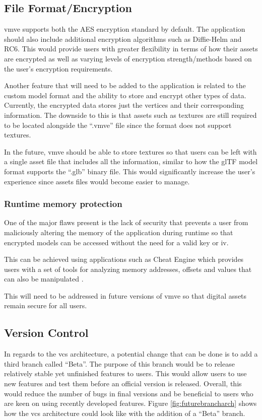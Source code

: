 \documentclass[11pt]{article}
\begin{document}
\subsection{File Format/Encryption}
\gls*{vmve} supports both the AES encryption standard by default. The application
should also include additional encryption algorithms such as Diffie-Helm and
RC6. This would provide users with greater flexibility in terms of how their
assets are encrypted as well as varying levels of encryption strength/methods
based on the user's encryption requirements.

Another feature that will need to be added to the application is related to the
custom model format and the ability to store and encrypt other types of data.
Currently, the encrypted data stores just the vertices and their corresponding
information. The downside to this is that assets such as textures are still
required to be located alongside the ``.vmve'' file since the format does not
support textures.

In the future, \gls*{vmve} should be able to store textures so that users can be
left with a single asset file that includes all the information, similar to how
the glTF model format supports the ``.glb'' binary file. This would
significantly increase the user's experience since assets files would become
easier to manage.

\subsubsection{Runtime memory protection}
One of the major flaws present is the lack of security that prevents a user from
maliciously altering the memory of the application during runtime so that
encrypted models can be accessed without the need for a valid key or iv.

This can be achieved using applications such as Cheat Engine which provides
users with a set of tools for analyzing memory addresses, offsets and values
that can also be manipulated \cite{cheat_engine}.

This will need to be addressed in future versions of \gls*{vmve} so that digital
assets remain secure for all users.

\subsection{Version Control}
In regards to the \gls*{vcs} architecture, a potential change that can be done is
to add a third branch called ``Beta''. The purpose of this branch would be to
release relatively stable yet unfinished features to users. This would allow
users to use new features and test them before an official version is released.
Overall, this would reduce the number of bugs in final versions and be
beneficial to users who are keen on using recently developed features. Figure
\ref{fig:futurebrancharch} shows how the \gls*{vcs} architecture could look like
with the addition of a ``Beta'' branch.
\end{document}
